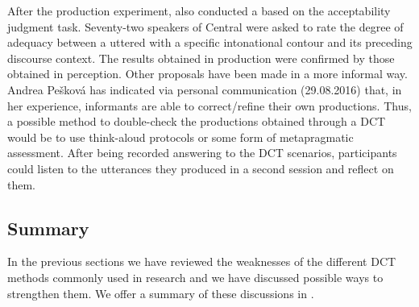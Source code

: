 \documentclass[output=paper]{LSP/langsci}
\begin{document}
After the production experiment, \citet{Borras-Comes2015} also conducted a  based on the acceptability judgment task. Seventy-two speakers of Central  were asked to rate the degree of adequacy between a  uttered with a specific intonational contour and its preceding discourse context. The results obtained in production were confirmed by those obtained in perception. Other proposals have been made in a more informal way. Andrea Pešková has indicated via personal communication (29.08.2016) that, in her experience, informants are able to correct/refine their own productions. Thus, a possible method to double-check the productions obtained through a DCT would be to use think-aloud protocols or some form of metapragmatic assessment. After being recorded answering to the DCT scenarios, par\-ti\-ci\-pants could listen to the utterances they produced in a second session and reflect on them.


\subsection{Summary}
\label{sec:van:4}

In the previous sections we have reviewed the weaknesses of the different DCT methods commonly used in  research and we have discussed possible ways to strengthen them.  We offer a summary of these discussions in .
\end{document}
